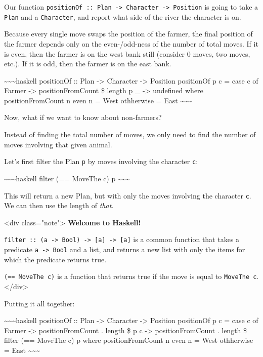 \documentclass[]{article}
\begin{document}
Our function
\texttt{positionOf\ ::\ Plan\ -\textgreater{}\ Character\ -\textgreater{}\ Position}
is going to take a \texttt{Plan} and a \texttt{Character}, and report what side
of the river the character is on.

Because every single move swaps the position of the farmer, the final position
of the farmer depends only on the even-/odd-ness of the number of total moves.
If it is even, then the farmer is on the west bank still (consider 0 moves, two
moves, etc.). If it is odd, then the farmer is on the east bank.

\textasciitilde{}\textasciitilde{}\textasciitilde{}haskell positionOf :: Plan
-\textgreater{} Character -\textgreater{} Position positionOf p c = case c of
Farmer -\textgreater{} positionFromCount \$ length p \_ -\textgreater{}
undefined where positionFromCount n \textbar{} even n = West \textbar{}
othherwise = East \textasciitilde{}\textasciitilde{}\textasciitilde{}

Now, what if we want to know about non-farmers?

Instead of finding the total number of moves, we only need to find the number of
moves involving that given animal.

Let's first filter the Plan \texttt{p} by moves involving the character
\texttt{c}:

\textasciitilde{}\textasciitilde{}\textasciitilde{}haskell filter (== MoveThe c)
p \textasciitilde{}\textasciitilde{}\textasciitilde{}

This will return a new Plan, but with only the moves involving the character
\texttt{c}. We can then use the length of \emph{that}.

\textless{}div class="note"\textgreater{} \textbf{Welcome to Haskell!}

\texttt{filter\ ::\ (a\ -\textgreater{}\ Bool)\ -\textgreater{}\ {[}a{]}\ -\textgreater{}\ {[}a{]}}
is a common function that takes a predicate \texttt{a\ -\textgreater{}\ Bool}
and a list, and returns a new list with only the items for which the predicate
returns true.

\texttt{(==\ MoveThe\ c)} is a function that returns true if the move is equal
to \texttt{MoveThe\ c}. \textless{}/div\textgreater{}

Putting it all together:

\textasciitilde{}\textasciitilde{}\textasciitilde{}haskell positionOf :: Plan
-\textgreater{} Character -\textgreater{} Position positionOf p c = case c of
Farmer -\textgreater{} positionFromCount . length \$ p c -\textgreater{}
positionFromCount . length \$ filter (== MoveThe c) p where positionFromCount n
\textbar{} even n = West \textbar{} othherwise = East
\textasciitilde{}\textasciitilde{}\textasciitilde{}
\end{document}
